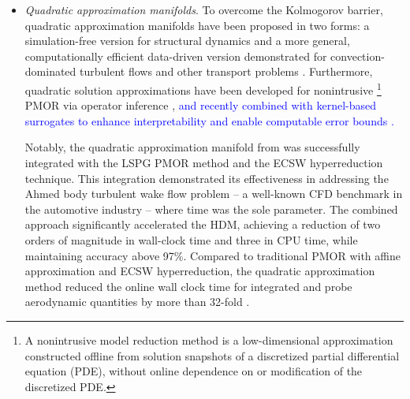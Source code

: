 \documentclass[preprint,10pt]{elsarticle}
\begin{document}
\begin{itemize}
	\item {\it Quadratic approximation manifolds}. To overcome the Kolmogorov barrier,  quadratic approximation manifolds have been proposed in two forms: a simulation-free 
		version for structural dynamics \cite{jain2017quadratic} and a more general, computationally efficient data-driven version demonstrated for convection-dominated 
		turbulent flows and other transport problems \cite{barnett2022quadratic}. Furthermore, quadratic solution approximations have been developed for nonintrusive \footnote{A nonintrusive model reduction method is a low-dimensional approximation constructed 
		offline from solution snapshots of a discretized partial differential equation (PDE), without online dependence on or
		modification of the discretized PDE.} PMOR via operator inference \cite{kramer2024learning}, \textcolor{blue}{and recently combined with kernel-based surrogates to enhance interpretability and enable computable error bounds \cite{diaz2025interpretable}.}

		Notably, the quadratic approximation manifold from \cite{barnett2022quadratic} was successfully integrated with the LSPG PMOR method \cite{carlberg2011efficient, carlberg2013gnat} 
		and the ECSW hyperreduction technique. This integration demonstrated its effectiveness in addressing the Ahmed body turbulent wake flow problem -- a well-known CFD benchmark in the 
		automotive industry -- where time was the sole parameter. The combined approach significantly accelerated the HDM, achieving a reduction of two orders of magnitude in wall-clock 
		time and three in CPU time, while maintaining accuracy above 97\%. Compared to traditional PMOR with affine approximation and ECSW hyperreduction, the quadratic approximation method reduced 
		the online wall clock time for integrated and probe aerodynamic quantities by more than 32-fold \cite{barnett2022quadratic}. 


\end{itemize}
\end{document}
